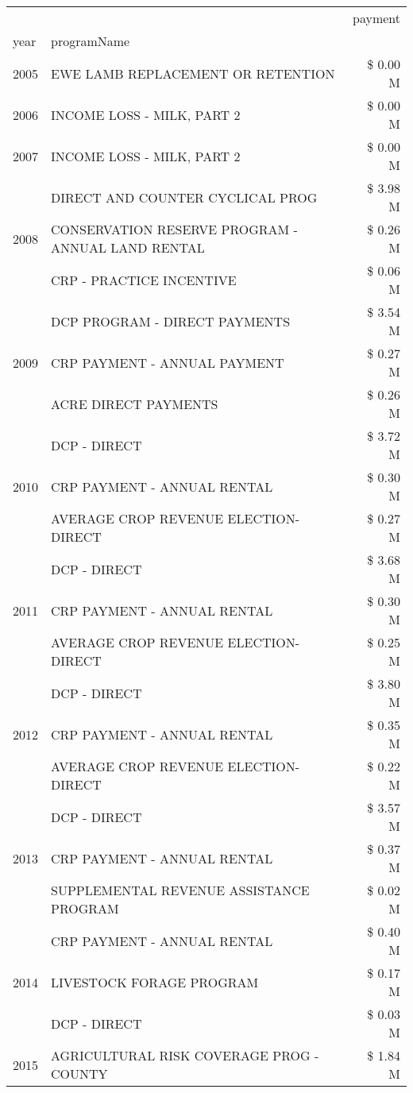 \begin{tabular}{llr}
\toprule
 &  & payment \\
year & programName &  \\
\midrule
2005 & EWE LAMB REPLACEMENT OR RETENTION & \$ 0.00 M \\
\cline{1-3}
2006 & INCOME LOSS - MILK, PART 2 & \$ 0.00 M \\
\cline{1-3}
2007 & INCOME LOSS - MILK, PART 2 & \$ 0.00 M \\
\cline{1-3}
\multirow[t]{3}{*}{2008} & DIRECT AND COUNTER CYCLICAL PROG & \$ 3.98 M \\
 & CONSERVATION RESERVE PROGRAM - ANNUAL LAND RENTAL & \$ 0.26 M \\
 & CRP - PRACTICE INCENTIVE & \$ 0.06 M \\
\cline{1-3}
\multirow[t]{3}{*}{2009} & DCP PROGRAM - DIRECT PAYMENTS & \$ 3.54 M \\
 & CRP PAYMENT - ANNUAL PAYMENT & \$ 0.27 M \\
 & ACRE DIRECT PAYMENTS & \$ 0.26 M \\
\cline{1-3}
\multirow[t]{3}{*}{2010} & DCP - DIRECT & \$ 3.72 M \\
 & CRP PAYMENT - ANNUAL RENTAL & \$ 0.30 M \\
 & AVERAGE CROP REVENUE ELECTION-DIRECT & \$ 0.27 M \\
\cline{1-3}
\multirow[t]{3}{*}{2011} & DCP - DIRECT & \$ 3.68 M \\
 & CRP PAYMENT - ANNUAL RENTAL & \$ 0.30 M \\
 & AVERAGE CROP REVENUE ELECTION-DIRECT & \$ 0.25 M \\
\cline{1-3}
\multirow[t]{3}{*}{2012} & DCP - DIRECT & \$ 3.80 M \\
 & CRP PAYMENT - ANNUAL RENTAL & \$ 0.35 M \\
 & AVERAGE CROP REVENUE ELECTION-DIRECT & \$ 0.22 M \\
\cline{1-3}
\multirow[t]{3}{*}{2013} & DCP - DIRECT & \$ 3.57 M \\
 & CRP PAYMENT - ANNUAL RENTAL & \$ 0.37 M \\
 & SUPPLEMENTAL REVENUE ASSISTANCE PROGRAM & \$ 0.02 M \\
\cline{1-3}
\multirow[t]{3}{*}{2014} & CRP PAYMENT - ANNUAL RENTAL & \$ 0.40 M \\
 & LIVESTOCK FORAGE PROGRAM & \$ 0.17 M \\
 & DCP - DIRECT & \$ 0.03 M \\
\cline{1-3}
\multirow[t]{3}{*}{2015} & AGRICULTURAL RISK COVERAGE PROG - COUNTY & \$ 1.84 M \\

\end{tabular}
